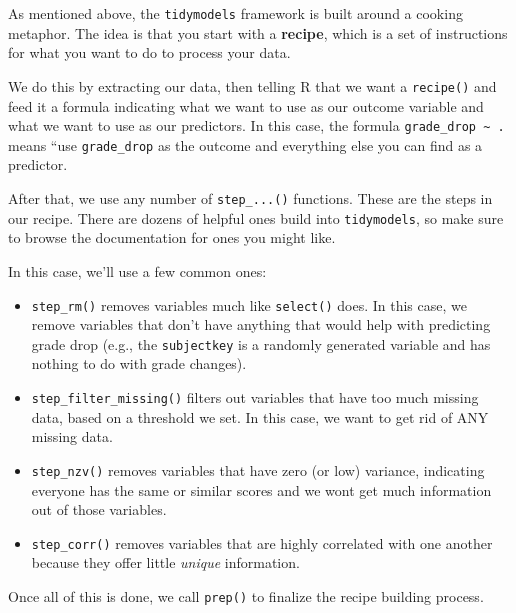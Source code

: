 \documentclass[
]{book}
\providecommand{\tightlist}{%
  \setlength{\itemsep}{0pt}\setlength{\parskip}{0pt}}
\begin{document}
As mentioned above, the \texttt{tidymodels} framework is built around a cooking metaphor. The idea is that you start with a \textbf{recipe}, which is a set of instructions for what you want to do to process your data.

We do this by extracting our data, then telling R that we want a \texttt{recipe()} and feed it a formula indicating what we want to use as our outcome variable and what we want to use as our predictors. In this case, the formula \texttt{grade\_drop\ \textasciitilde{}\ .} means ``use \texttt{grade\_drop} as the outcome and everything else you can find as a predictor.

After that, we use any number of \texttt{step\_...()} functions. These are the steps in our recipe. There are dozens of helpful ones build into \texttt{tidymodels}, so make sure to browse the documentation for ones you might like.

In this case, we'll use a few common ones:

\begin{itemize}
\tightlist
\item
  \texttt{step\_rm()} removes variables much like \texttt{select()} does. In this case, we remove variables that don't have anything that would help with predicting grade drop (e.g., the \texttt{subjectkey} is a randomly generated variable and has nothing to do with grade changes).
\item
  \texttt{step\_filter\_missing()} filters out variables that have too much missing data, based on a threshold we set. In this case, we want to get rid of ANY missing data.
\item
  \texttt{step\_nzv()} removes variables that have zero (or low) variance, indicating everyone has the same or similar scores and we wont get much information out of those variables.
\item
  \texttt{step\_corr()} removes variables that are highly correlated with one another because they offer little \emph{unique} information.
\end{itemize}

Once all of this is done, we call \texttt{prep()} to finalize the recipe building process.
\end{document}
